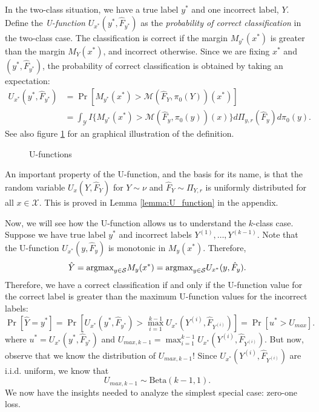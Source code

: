 \documentclass[12pt]{article}
\begin{document}
In the two-class situation, we have a true label $y^*$ and one
incorrect label, $Y$.  Define the \emph{U-function}
$U_{x^*}(y^*, \hat{F}_{y^*})$ as the \emph{probability of correct
classification} in the two-class case.
The classification is correct if the margin
$M_{y^*}(x^*)$ is greater than the margin $M_Y(x^*)$, and incorrect
otherwise.  
Since we are fixing $x^*$ and $(y^*, \hat{F}_{y^*})$, the
probability of correct classification is obtained by taking an expectation:
\begin{align}\label{eq:U_function}
U_{x^*}(y^*, \hat{F}_{y^*}) &= \Pr[M_{y^*}(x^*) > \mathcal{M}(\hat{F}_Y, \pi_0(Y))(x^*)]
\\&= \int_{\mathcal{Y}} 
I\{
M_{y^*}(x^*) > \mathcal{M}(\hat{F}_{y}, \pi_0(y))(x)
\}
d\Pi_{y, r}(\hat{F}_y)
d\pi_0(y).
\end{align}
See also figure \ref{fig:U_function} for an graphical illustration of
the definition.

\begin{figure}[h]
\centering
\caption{U-functions}\label{fig:U_function}
\end{figure}

An important property of the U-function, and the basis for its name,
is that the random variable $U_x(Y, \hat{F}_Y)$ for $Y \sim \nu$ and
$\hat{F}_Y \sim \Pi_{Y, r}$ is uniformly distributed for all
$x \in \mathcal{X}$.  This is proved in Lemma \ref{lemma:U_function}
in the appendix.

Now, we will see how the U-function allows us to understand the
$k$-class case.  Suppose we have true label $y^*$ and incorrect labels
$Y^{(1)},\hdots, Y^{(k-1)}$.  Note that the U-function
$U_{x^*}(y, \hat{F}_y)$ is monotonic in $M_y(x^*)$.  Therefore,
\[
\hat{Y} = \text{argmax}_{y \in \mathcal{S}} M_y(x^*) = \text{argmax}_{y \in \mathcal{S}} U_{x^*}(y, \hat{F}_y).
\]
Therefore, we have a correct classification if and only if the U-function value for the correct label
is greater than the maximum U-function values for the incorrect labels:
\[
\Pr[\hat{Y} = y^*] = \Pr[U_{x^*}(y^*, \hat{F}_{y^*}) > \max_{i=1}^{k-1} U_{x^*}(Y^{(i)}, \hat{F}_{Y^{(i)}})] =  \Pr[u^* > U_{max}].
\]
where $u^* = U_{x^*}(y^*, \hat{F}_{y^*})$ and $U_{max, k-1}
= \max_{i=1}^{k-1} U_{x^*}(Y^{(i)}, \hat{F}_{Y^{(i)}})$.  But now,
observe that we know the distribution of $U_{max, k-1}$!  Since
$U_{x^*}(Y^{(i)}, \hat{F}_{Y^{(i)}})$ are i.i.d. uniform, we know that
\begin{equation}\label{eq:umax_beta}
U_{max, k-1} \sim \text{Beta}(k-1, 1). 
\end{equation}
We now have the insights needed to analyze the simplest special case: zero-one loss.
\newline
\end{document}
